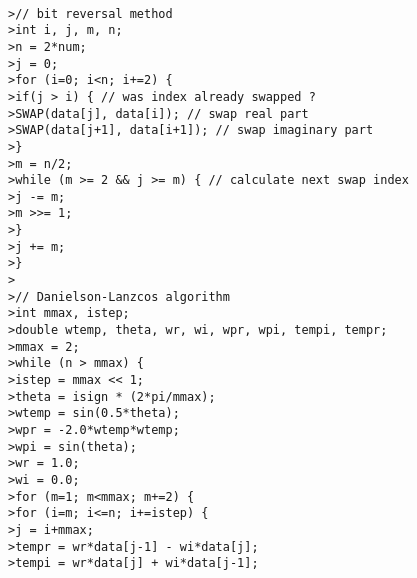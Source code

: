 \texttt{ \\
>\quad // bit reversal method \\
>\quad int i, j, m, n; \\
>\quad n = 2*num; \\
>\quad j = 0; \\
>\quad for (i=0; i<n; i+=2) \{ \\
>\quad \qquad if(j > i) \{   // was index already swapped ? \\
>\quad \qquad\qquad SWAP(data[j], data[i]);   // swap real part \\
>\quad \qquad\qquad SWAP(data[j+1], data[i+1]);   // swap imaginary part \\
>\quad \qquad \} \\
>\quad \qquad m = n/2; \\
>\quad \qquad while (m >= 2 \&\& j >= m) \{  // calculate next swap index \\
>\quad \qquad\qquad j -= m; \\
>\quad \qquad\qquad m >>= 1; \\
>\quad \qquad \} \\
>\quad \qquad j += m; \\
>\quad \} \\
>\quad \\
>\quad // Danielson-Lanzcos algorithm \\
>\quad int mmax, istep; \\
>\quad double wtemp, theta, wr, wi, wpr, wpi, tempi, tempr; \\
>\quad mmax = 2; \\
>\quad while (n > mmax) \{ \\
>\quad \qquad istep = mmax << 1; \\
>\quad \qquad theta = isign * (2*pi/mmax); \\
>\quad \qquad wtemp = sin(0.5*theta); \\
>\quad \qquad wpr = -2.0*wtemp*wtemp; \\
>\quad \qquad wpi = sin(theta); \\
>\quad \qquad wr = 1.0; \\
>\quad \qquad wi = 0.0; \\
>\quad \qquad for (m=1; m<mmax; m+=2) \{ \\
>\quad \qquad\qquad for (i=m; i<=n; i+=istep) \{ \\
>\quad \qquad\qquad\qquad j = i+mmax; \\
>\quad \qquad\qquad\qquad tempr = wr*data[j-1] - wi*data[j]; \\
>\quad \qquad\qquad\qquad tempi = wr*data[j] + wi*data[j-1]; \\
}
